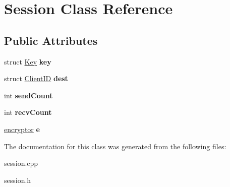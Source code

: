 \hypertarget{classSession}{
\section{Session Class Reference}
\label{classSession}
}
\subsection*{Public Attributes}
\begin{DoxyCompactItemize}
\item 
\hypertarget{classSession_ab0f29bf66ba72ab903ab18dbc5319201}{
struct \hyperlink{structKey}{Key} {\bfseries key}}
\label{classSession_ab0f29bf66ba72ab903ab18dbc5319201}

\item 
\hypertarget{classSession_ad4fc2fe2a13a23d3a36a5b9a6f0aa2c2}{
struct \hyperlink{structClientID}{ClientID} {\bfseries dest}}
\label{classSession_ad4fc2fe2a13a23d3a36a5b9a6f0aa2c2}

\item 
\hypertarget{classSession_a2da1dccc9125b01ce6ee81e7edfc39a0}{
int {\bfseries sendCount}}
\label{classSession_a2da1dccc9125b01ce6ee81e7edfc39a0}

\item 
\hypertarget{classSession_ab58f8014c2ba62f0d10ba05f9ea51261}{
int {\bfseries recvCount}}
\label{classSession_ab58f8014c2ba62f0d10ba05f9ea51261}

\item 
\hypertarget{classSession_af18f77200a3b19ec49ac6ad049784a39}{
\hyperlink{classencryptor}{encryptor} {\bfseries e}}
\label{classSession_af18f77200a3b19ec49ac6ad049784a39}

\end{DoxyCompactItemize}


The documentation for this class was generated from the following files:\begin{DoxyCompactItemize}
\item 
session.cpp\item 
session.h\end{DoxyCompactItemize}
